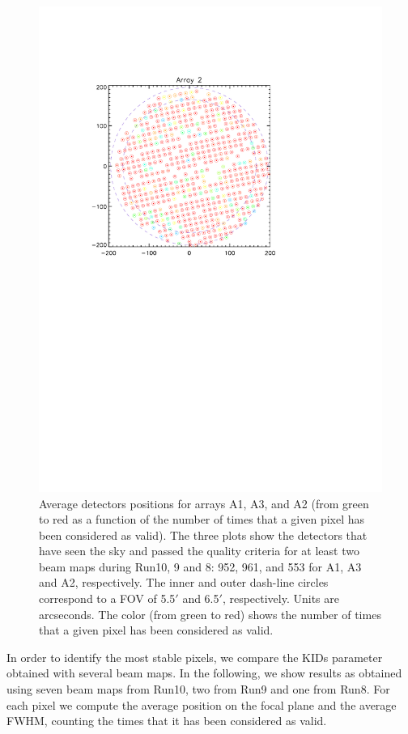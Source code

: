 \begin{figure}[p]
\begin{center}
\includegraphics[trim=2cm 14cm 4cm 4cm, clip=true,width=0.55\linewidth]{Figures/A2_fwhm_color_count.pdf}
\caption[KID selection]{Average detectors positions for arrays A1, A3, and A2 (from
  green to red as a function of the number of times that a given pixel
  has been considered as valid). The three plots show the detectors
  that have seen the sky and passed the quality criteria for at least
  two beam maps during Run10, 9 and 8: 952, 961, and 553
  for A1, A3 and A2, respectively. The inner and outer dash-line circles correspond to a 
  FOV of 5.5$\prime$ and 6.5$\prime$, respectively. Units are arcseconds. 
  The color (from green to red)  shows the number of times that a given pixel has been considered as valid.}
\label{fig:avg_fov_color}
\end{center}
\end{figure}

In order to identify the most stable pixels, we compare the KIDs parameter obtained with several beam maps. 
In the following, we show results as obtained using seven beam maps from Run10, two from Run9 and one from Run8.
For each pixel we compute the average position on the focal plane and the average FWHM, counting the times that it has been considered as valid.

